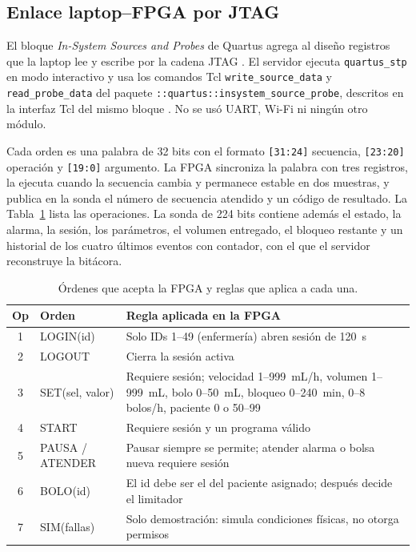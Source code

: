 \documentclass[11pt,letterpaper]{article}
\newcommand{\code}[1]{\texttt{#1}}
\begin{document}
\subsection{Enlace laptop--FPGA por JTAG}
El bloque \emph{In-System Sources and Probes} de Quartus agrega al diseño registros que la laptop lee y escribe por la cadena JTAG \cite{issp,jtag}. El servidor ejecuta \code{quartus\_stp} en modo interactivo y usa los comandos Tcl \code{write\_source\_data} y \code{read\_probe\_data} del paquete \code{::quartus::insystem\_source\_probe}, descritos en la interfaz Tcl del mismo bloque \cite{issp}. No se usó UART, Wi-Fi ni ningún otro módulo.

Cada orden es una palabra de 32 bits con el formato \code{[31:24]} secuencia, \code{[23:20]} operación y \code{[19:0]} argumento. La FPGA sincroniza la palabra con tres registros, la ejecuta cuando la secuencia cambia y permanece estable en dos muestras, y publica en la sonda el número de secuencia atendido y un código de resultado. La Tabla~\ref{tab:ordenes} lista las operaciones. La sonda de 224 bits contiene además el estado, la alarma, la sesión, los parámetros, el volumen entregado, el bloqueo restante y un historial de los cuatro últimos eventos con contador, con el que el servidor reconstruye la bitácora.

\begin{table}[H]
\centering
\caption{Órdenes que acepta la FPGA y reglas que aplica a cada una.}
\label{tab:ordenes}
\begin{tabularx}{\linewidth}{clX}
\toprule
\textbf{Op} & \textbf{Orden} & \textbf{Regla aplicada en la FPGA} \\
\midrule
1 & LOGIN(id) & Solo IDs 1--49 (enfermería) abren sesión de 120~s \\
2 & LOGOUT & Cierra la sesión activa \\
3 & SET(sel, valor) & Requiere sesión; velocidad 1--999~mL/h, volumen 1--999~mL, bolo 0--50~mL, bloqueo 0--240~min, 0--8 bolos/h, paciente 0 o 50--99 \\
4 & START & Requiere sesión y un programa válido \\
5 & PAUSA / ATENDER & Pausar siempre se permite; atender alarma o bolsa nueva requiere sesión \\
6 & BOLO(id) & El id debe ser el del paciente asignado; después decide el limitador \\
7 & SIM(fallas) & Solo demostración: simula condiciones físicas, no otorga permisos \\
\bottomrule
\end{tabularx}
\end{table}
\end{document}
